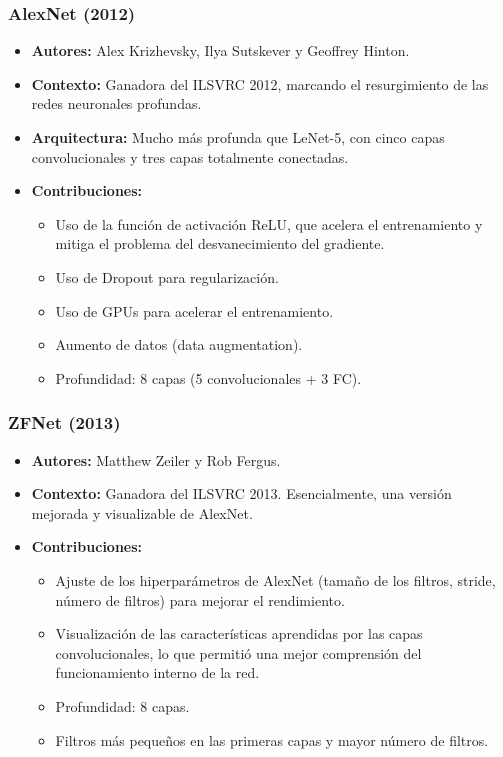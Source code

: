 \documentclass{article}
\begin{document}
\subsubsection{AlexNet (2012)}

\begin{itemize}
    \item \textbf{Autores:} Alex Krizhevsky, Ilya Sutskever y Geoffrey Hinton.
    \item \textbf{Contexto:}  Ganadora del ILSVRC 2012, marcando el resurgimiento de las redes neuronales profundas.
    \item \textbf{Arquitectura:}  Mucho más profunda que LeNet-5, con cinco capas convolucionales y tres capas totalmente conectadas.
    \item \textbf{Contribuciones:}
    \begin{itemize}
        \item Uso de la función de activación ReLU, que acelera el entrenamiento y mitiga el problema del desvanecimiento del gradiente.
        \item Uso de Dropout para regularización.
        \item Uso de GPUs para acelerar el entrenamiento.
        \item Aumento de datos (data augmentation).
        \item Profundidad: 8 capas (5 convolucionales + 3 FC).
    \end{itemize}
\end{itemize}

\subsubsection{ZFNet (2013)}

\begin{itemize}
    \item \textbf{Autores:} Matthew Zeiler y Rob Fergus.
    \item \textbf{Contexto:}  Ganadora del ILSVRC 2013.  Esencialmente, una versión mejorada y visualizable de AlexNet.
    \item \textbf{Contribuciones:}
    \begin{itemize}
        \item Ajuste de los hiperparámetros de AlexNet (tamaño de los filtros, stride, número de filtros) para mejorar el rendimiento.
        \item Visualización de las características aprendidas por las capas convolucionales, lo que permitió una mejor comprensión del funcionamiento interno de la red.
        \item Profundidad: 8 capas.
        \item Filtros más pequeños en las primeras capas y mayor número de filtros.
    \end{itemize}
\end{itemize}
\end{document}
